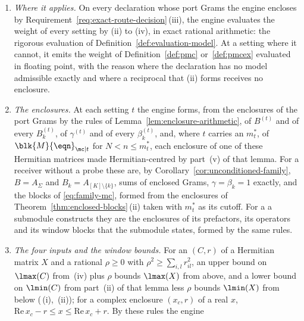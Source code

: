 \begin{requirement}\label{req:rigorous-weight}
\begin{enumerate}[label=(\roman*),leftmargin=2.4em]
\item \emph{Where it applies.} On every declaration whose port Grams the
  engine encloses by Requirement~\ref{req:exact-route-decision}\,(iii), the
  engine evaluates the weight of every setting by (ii) to (iv), in exact
  rational arithmetic: the rigorous evaluation of
  Definition~\ref{def:evaluation-model}. At a setting where it cannot, it
  emits the weight of Definition~\ref{def:pmc} or~\ref{def:pmcex} evaluated in
  floating point, with the reason  where the
  declaration has no model admissible exactly and
   where a reciprocal that (ii) forms
  receives no enclosure.
\item \emph{The enclosures.} At each setting $t$ the engine forms, from the
  enclosures of the port Grams by the rules of
  Lemma~\ref{lem:enclosure-arithmetic},
   of $B^{(t)}$ and of every
  $B^{(t)}_k$, of $\gamma^{(t)}$ and of every $\beta^{(t)}_k$, and, where $t$
  carries an  $m^{\ast}_t$, of
  $\blk{M}{\eqn}_{\mc|t}$ for $N<n\le m^{\ast}_t$, each enclosure of one of
  these Hermitian matrices made Hermitian-centred by part~(v) of that lemma.
  For a receiver without a probe these are, by
  Corollary~\ref{cor:unconditioned-family}, $B=A_\Sigma$ and
  $B_k=A_{[K]\setminus\{k\}}$, sums of enclosed Grams, $\gamma=\beta_k=1$
  exactly, and the blocks of \eqref{eq:family-mc}, formed from the enclosures
  of Theorem~\ref{thm:enclosed-blocks}\,(ii) taken with $m^{\ast}_t$ as its
  cutoff. For a  a submodule constructs they are the
  enclosures of its prefactors, its operators and its window blocks that the
  submodule states, formed by the same rules.
\item \emph{The four inputs and the window bounds.} For an
   $(C,r)$ of a Hermitian matrix $X$ and a rational
  $\rho\ge0$ with $\rho^{2}\ge\sum_{i,l}r_{il}^{2}$, an upper bound on
  $\lmax(C)$ from \,(iv) plus
  $\rho$ bounds $\lmax(X)$ from above, and a lower bound on $\lmin(C)$ from
  part~(ii) of that lemma less $\rho$ bounds $\lmin(X)$ from below
  (\,(i),~(ii)); for a
  complex enclosure $(x_c,r)$ of a real $x$,
  $\mathrm{Re}\,x_c-r\le x\le\mathrm{Re}\,x_c+r$. By these rules the engine

\end{enumerate}
\end{requirement}

